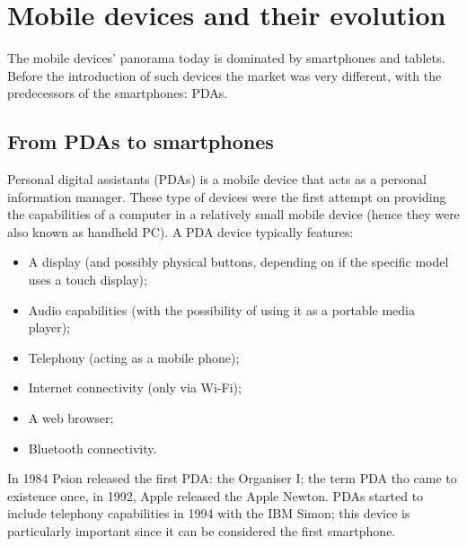 \section{Mobile devices and their evolution}
The mobile devices' panorama today is dominated by smartphones and tablets. Before the introduction of such devices the market was very different, with the predecessors of the smartphones: PDAs.

\subsection{From PDAs to smartphones}
Personal digital assistants (PDAs) is a mobile device that acts as a personal information manager. These type of devices were the first attempt on providing the capabilities of a computer in a relatively small mobile device (hence they were also known as handheld PC). A PDA device typically features:
\begin{itemize}
    \item A display (and possibly physical buttons, depending on if the specific model uses a touch display);
    \item Audio capabilities (with the possibility of using it as a portable media player);
    \item Telephony (acting as a mobile phone);
    \item Internet connectivity (only via Wi-Fi);
    \item A web browser;
    \item Bluetooth connectivity.
\end{itemize}

In 1984 Psion released the first PDA: the Organiser I; the term PDA tho came to existence once, in 1992, Apple released the Apple Newton. PDAs started to include telephony capabilities in 1994 with the IBM Simon; this device is particularly important since it can be considered the first smartphone.
\vspace{5mm}

